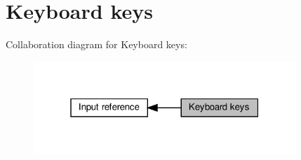 \hypertarget{group__keys}{}\section{Keyboard keys}
\label{group__keys}
Collaboration diagram for Keyboard keys\+:
\nopagebreak
\begin{figure}[H]
\begin{center}
\leavevmode
\includegraphics[width=280pt]{group__keys}
\end{center}
\end{figure}
